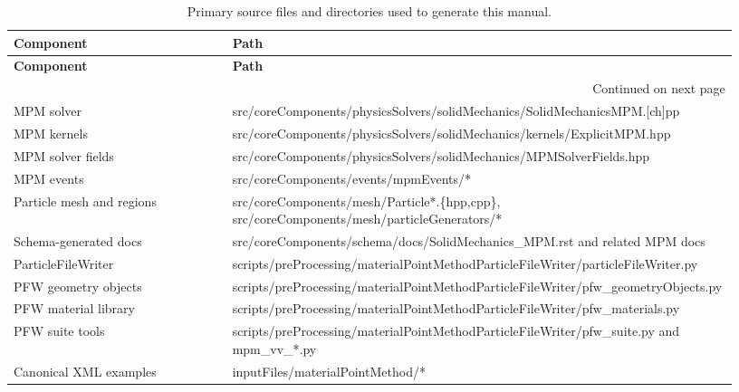 {\renewcommand{\arraystretch}{1.15}
\small
\begin{longtable}{@{}p{0.30\linewidth}p{0.63\linewidth}@{}}
\caption{Primary source files and directories used to generate this manual.}\label{tab:source-inventory}\\
\toprule
\textbf{Component} & \textbf{Path}\\
\midrule
\endfirsthead
\toprule
\textbf{Component} & \textbf{Path}\\
\midrule
\endhead
\midrule
\multicolumn{2}{r}{Continued on next page}\\
\endfoot
\bottomrule
\endlastfoot
MPM solver & {\ttfamily\footnotesize src/\allowbreak{}coreComponents/\allowbreak{}physicsSolvers/\allowbreak{}solidMechanics/\allowbreak{}SolidMechanicsMPM.\allowbreak{}[ch]pp}\\
MPM kernels & {\ttfamily\footnotesize src/\allowbreak{}coreComponents/\allowbreak{}physicsSolvers/\allowbreak{}solidMechanics/\allowbreak{}kernels/\allowbreak{}ExplicitMPM.\allowbreak{}hpp}\\
MPM solver fields & {\ttfamily\footnotesize src/\allowbreak{}coreComponents/\allowbreak{}physicsSolvers/\allowbreak{}solidMechanics/\allowbreak{}MPMSolverFields.\allowbreak{}hpp}\\
MPM events & {\ttfamily\footnotesize src/\allowbreak{}coreComponents/\allowbreak{}events/\allowbreak{}mpmEvents/\allowbreak{}*}\\
Particle mesh and regions & {\ttfamily\footnotesize src/\allowbreak{}coreComponents/\allowbreak{}mesh/\allowbreak{}Particle*.\allowbreak{}\{hpp,cpp\}, src/\allowbreak{}coreComponents/\allowbreak{}mesh/\allowbreak{}particleGenerators/\allowbreak{}*}\\
Schema-generated docs & {\ttfamily\footnotesize src/\allowbreak{}coreComponents/\allowbreak{}schema/\allowbreak{}docs/\allowbreak{}SolidMechanics\_\allowbreak{}MPM.\allowbreak{}rst and related MPM docs}\\
ParticleFileWriter & {\ttfamily\footnotesize scripts/\allowbreak{}preProcessing/\allowbreak{}materialPointMethodParticleFileWriter/\allowbreak{}particleFileWriter.\allowbreak{}py}\\
PFW geometry objects & {\ttfamily\footnotesize scripts/\allowbreak{}preProcessing/\allowbreak{}materialPointMethodParticleFileWriter/\allowbreak{}pfw\_\allowbreak{}geometryObjects.\allowbreak{}py}\\
PFW material library & {\ttfamily\footnotesize scripts/\allowbreak{}preProcessing/\allowbreak{}materialPointMethodParticleFileWriter/\allowbreak{}pfw\_\allowbreak{}materials.\allowbreak{}py}\\
PFW suite tools & {\ttfamily\footnotesize scripts/\allowbreak{}preProcessing/\allowbreak{}materialPointMethodParticleFileWriter/\allowbreak{}pfw\_\allowbreak{}suite.\allowbreak{}py and mpm\_\allowbreak{}vv\_\allowbreak{}*.\allowbreak{}py}\\
Canonical XML examples & {\ttfamily\footnotesize inputFiles/\allowbreak{}materialPointMethod/\allowbreak{}*}\\
\end{longtable}
}
